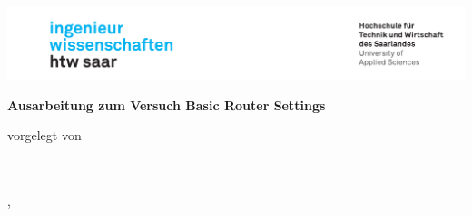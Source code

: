 \begin{titlepage}\linespread{1.5}\selectfont
\includegraphics[width=\linewidth]{Graphics/htwsaar_Logo_inwi_head_VF_4C_crop}
  \begin{center}
    \large  
    \hfill
    \vfill
    \begingroup
      \Large\bfseries\huge Ausarbeitung zum Versuch
    \endgroup
	\hfill
    \vfill
    \begingroup
      \Large\bfseries\huge Basic Router Settings
    \endgroup
% 		
%     
   \vfill
% 
% 
	
  vorgelegt von \\
  \vspace{\baselineskip}
  \NameL\\
  \NameY\\
	
  \vfill
	
% 	
  \vfill
	
  \myLocation, \myTime                   

    \end{center}       
\end{titlepage}   